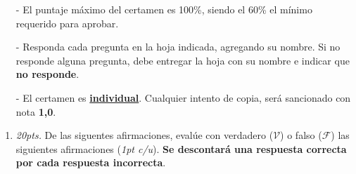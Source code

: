 \documentclass[10pt]{article}
\begin{document}
	{\scriptsize
	\begin{itemize}
		\item[-] El puntaje m\'aximo del certamen es 100\%, siendo el 60\% el m\'inimo requerido para aprobar.
		\item[-] Responda cada pregunta en la hoja indicada, agregando su nombre. Si no responde alguna pregunta, debe entregar la hoja con su nombre e indicar que \textbf{no responde}.
		\item[-] El certamen es \underline{\textbf{individual}}. Cualquier intento de copia, ser\'a sancionado con nota \textbf{1,0}.
	\end{itemize}
	
	\vspace*{-20pt}

	\begin{enumerate}

		\item \emph{20pts.} De las siguentes afirmaciones, eval\'ue con verdadero ($\mathcal{V}$) o falso ($\mathcal{F}$) las siguientes afirmaciones (\emph{1pt c/u}). \textbf{Se descontar\'a una respuesta correcta por cada respuesta incorrecta}.
		

\end{enumerate}}
\end{document}
